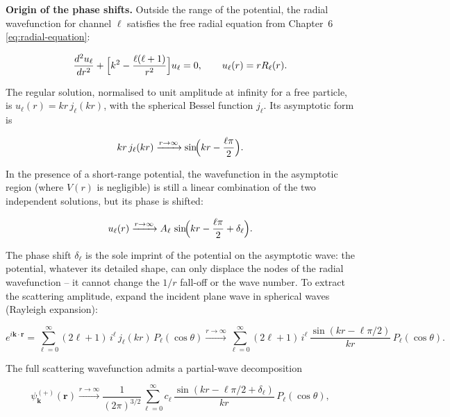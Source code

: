 \medskip\noindent\textbf{Origin of the phase shifts.}
Outside the range of the potential, the radial wavefunction for channel $\ell$ satisfies the free radial equation from Chapter~6 \eqref{eq:radial-equation}:
\begin{linenomath}
\begin{equation*}
\frac{d^{2}u_{\ell}}{dr^{2}} + \Bigl[k^{2} - \frac{\ell(\ell+1)}{r^{2}}\Bigr]u_{\ell} = 0,
\qquad u_{\ell}(r) = rR_{\ell}(r).
\end{equation*}
\end{linenomath}
The regular solution, normalised to unit amplitude at infinity for a free particle, is $u_{\ell}(r) = kr\,j_{\ell}(kr)$, with the spherical Bessel function $j_{\ell}$. Its asymptotic form is
\begin{linenomath}
\begin{equation*}
kr\,j_{\ell}(kr) \xrightarrow{r\to\infty} \sin\!\Bigl(kr - \frac{\ell\pi}{2}\Bigr).
\end{equation*}
\end{linenomath}
In the presence of a short-range potential, the wavefunction in the asymptotic region (where $V(r)$ is negligible) is still a linear combination of the two independent solutions, but its phase is shifted:
\begin{linenomath}
\begin{equation*}
u_{\ell}(r) \xrightarrow{r\to\infty} A_{\ell}\,\sin\!\Bigl(kr - \frac{\ell\pi}{2} + \delta_{\ell}\Bigr).
\end{equation*}
\end{linenomath}
The phase shift $\delta_{\ell}$ is the sole imprint of the potential on the asymptotic wave: the potential, whatever its detailed shape, can only displace the nodes of the radial wavefunction -- it cannot change the $1/r$ fall-off or the wave number.
To extract the scattering amplitude, expand the incident plane wave in spherical waves (Rayleigh expansion):
\begin{linenomath}
\begin{equation*}
e^{i\bm k\cdot\bm r} = \sum_{\ell=0}^{\infty}(2\ell+1)\,i^{\ell}\,j_{\ell}(kr)\,P_{\ell}(\cos\theta)
\xrightarrow{r\to\infty}
\sum_{\ell=0}^{\infty}(2\ell+1)\,i^{\ell}\,
\frac{\sin(kr - \ell\pi/2)}{kr}\,P_{\ell}(\cos\theta).
\end{equation*}
\end{linenomath}
The full scattering wavefunction admits a partial-wave decomposition
\begin{linenomath}
\begin{equation*}
\psi_{\bm k}^{(+)}(\bm r) \xrightarrow{r\to\infty}
\frac{1}{(2\pi)^{3/2}}\sum_{\ell=0}^{\infty}
c_{\ell}\,\frac{\sin(kr - \ell\pi/2 + \delta_{\ell})}{kr}\,P_{\ell}(\cos\theta),
\end{equation*}
\end{linenomath}
